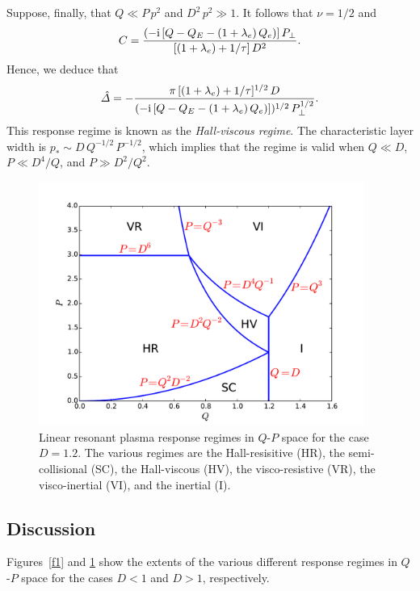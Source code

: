 \documentclass[notitlepage,12pt]{article}
\begin{document}
Suppose, finally, that $Q\ll P\,p^2$ and $D^2\,p^2\gg 1$. It follows that $\nu=1/2$ and
\begin{equation}
C = \frac{(-{\rm i}\,[Q-Q_E-(1+\lambda_e)\,Q_e)]\,P_\perp}{[(1+\lambda_e)+1/\tau]\,D^2}.
\end{equation}
Hence, we deduce that
\begin{equation}
\hat{\mit\Delta}= -\frac{\pi\,[(1+\lambda_e)+1/\tau]^{1/2}\,D}{(-{\rm i}\,[Q-Q_E-(1+\lambda_e)\,Q_e)])^{1/2}\,P_\perp^{1/2}}.
\end{equation}
This response regime is known as the {\em Hall-viscous regime}. The characteristic layer width is $p_\ast\sim
D\,Q^{-1/2}\,P^{-1/2}$, which implies that the regime is valid when $Q\ll D$, $P\ll D^4/Q$, and $P\gg D^2/Q^2$. 

\begin{figure}[t]
\centerline{\includegraphics[width=0.95\textwidth]{RegimeII.pdf}}
\caption{Linear resonant plasma response regimes in $Q$-$P$ space for the case $D=1.2$. The various regimes are
the Hall-resisitive (HR), the semi-collisional (SC), the Hall-viscous (HV), the visco-resistive (VR), the visco-inertial
(VI), and the inertial (I).}\label{f2}
\end{figure}

\subsection{Discussion}\label{dis1}
Figures~\ref{f1} and \ref{f2} show the extents of the various different response regimes in $Q$-$P$ space for the
cases $D<1$ and $D>1$, respectively. 
\end{document}
